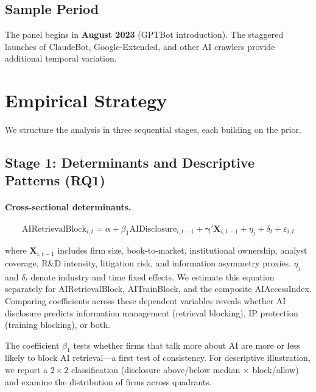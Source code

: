 \documentclass[12pt,a4paper]{article}
\begin{document}
\subsection{Sample Period}

The panel begins in \textbf{August 2023} (GPTBot introduction). The staggered launches of ClaudeBot, Google-Extended, and other AI crawlers provide additional temporal variation.

\section{Empirical Strategy}

We structure the analysis in three sequential stages, each building on the prior.

\subsection{Stage 1: Determinants and Descriptive Patterns (RQ1)}

\paragraph{Cross-sectional determinants.}
\begin{equation}
\text{AIRetrievalBlock}_{i,t} = \alpha + \beta_1 \text{AIDisclosure}_{i,t-1} + \boldsymbol{\gamma}' \mathbf{X}_{i,t-1} + \eta_j + \delta_t + \varepsilon_{i,t}
\end{equation}

\noindent where $\mathbf{X}_{i,t-1}$ includes firm size, book-to-market, institutional ownership, analyst coverage, R\&D intensity, litigation risk, and information asymmetry proxies. $\eta_j$ and $\delta_t$ denote industry and time fixed effects. We estimate this equation separately for AIRetrievalBlock, AITrainBlock, and the composite AIAccessIndex. Comparing coefficients across these dependent variables reveals whether AI disclosure predicts information management (retrieval blocking), IP protection (training blocking), or both.

The coefficient $\beta_1$ tests whether firms that talk more about AI are more or less likely to block AI retrieval---a first test of consistency. For descriptive illustration, we report a $2 \times 2$ classification (disclosure above/below median $\times$ block/allow) and examine the distribution of firms across quadrants.
\end{document}
